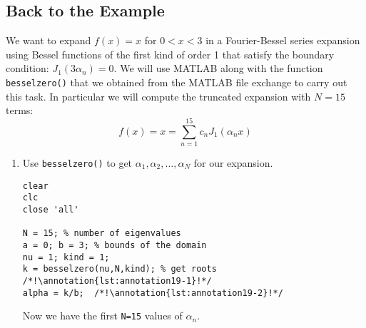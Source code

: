 \subsection{Back to the Example}
We want to expand $f(x)=x$ for $0<x<3$ in a Fourier-Bessel series expansion using Bessel functions of the first kind of order 1 that satisfy the boundary condition: $J_{1}(3\alpha_n)=0$.  We will use MATLAB along with the function \lstinline[style=myMatlab]{besselzero()} that we obtained from the MATLAB file exchange to carry out this task. In particular we will compute the truncated expansion with $N=15$ terms:
\begin{equation*}
f(x) = x = \sum\limits_{n=1}^{15}c_n J_1\left(\alpha_n x\right)
\end{equation*}

\begin{enumerate}
\item Use \lstinline[style=myMatlab]{besselzero()} to get $\alpha_1,\alpha_2,\dots,\alpha_N$ for our expansion.

\begin{lstlisting}[name=lec19_ex, style=myMatlab]
clear
clc
close 'all'

N = 15; % number of eigenvalues
a = 0; b = 3; % bounds of the domain
nu = 1; kind = 1;
k = besselzero(nu,N,kind); % get roots  /*!\annotation{lst:annotation19-1}!*/
alpha = k/b;  /*!\annotation{lst:annotation19-2}!*/
\end{lstlisting}

Now we have the first \lstinline{N=15} values of $\alpha_n$.


\end{enumerate}
